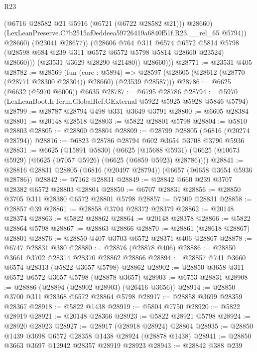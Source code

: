 \begin{lexlean}{R23}
\begin{coremodule}
                        (@6716 @28582 @21 @5916 (@6721 (@6722 @28582 @21)))
                        @28660)
                      (LexLeanPreserve.C7b2515af0eddeea59726419a6840f51f.R23.__rel_65 @5794))
                    @28660)
                  (@23041 @28677))
                (@28606
                  @764
                  @311
                  @6574
                  @6572
                  @5814
                  @5798
                  (@28598 @684 @239 @311 @6572 @6572 @5798 @5814 @28660 @23524)
                  @28660)))
            (@23531 @3629 @28290 @21480))
          @28660)))
@28771 := @23531 @405
@28782 := @28569
    (fun (core : @5894) =>
    @28597 (@28605 (@28612 (@28770 (@28771 @28300 @28304)) @28660) (@23539 @28587)))
@28786 := @6625 (@6632 (@5970 @6006)) @6635
@28787 := @6795 @28786
@28794 := @5970 (LexLeanBoot.IrTerm.GlobalRef.GExternal @5922 @5925 @5928 @5846 @5794)
@28799 := @28787 @28794 @498 @331 @3649 @3791
@28800 := @6605 @28384
@28801 := @20148 @28518
@28803 := @5822 @28801 @5798
@28804 := @5810 @28803
@28805 := @28800 @28804
@28809 := @28799 @28805 (@6816 (@20274 @28794))
@28816 := @6823 @28786 @28794 @602 @3654 @3708 @3790 @5936
@28831 := @6625
    (@15891 @5830)
    (@6625 (@15688 @5931) (@6625 (@10673 @5929) (@6625 (@7057 @5926) (@6625 (@6859 @5923) @28786))))
@28841 := @28816 @28831 @28805 (@6816 (@20497 @28794)) (@6657 (@6658 @3654 @5936 @28786))
@28842 := @7162 @28831
@28849 := @28842 @660 @239 @3707 @28382 @6572 @28803 @28804
@28850 := @6707 @28831
@28856 := @28850 @3705 @311 @28380 @6572 @28801 @5798
@28857 := @7309 @28831
@28858 := @28857 @39
@28861 := @28858 @3704 @28372 @28379
@28862 := @20148 @28374
@28863 := @5822 @28862
@28864 := @20148 @28378
@28866 := @5822 @28864 @5798
@28867 := @28863 @28866
@28870 := @28861 (@28618 @28867) @28801
@28876 := @28850 @407 @3703 @6572 @28371 @406 @28867
@28878 := @6747 @28831 @380
@28880 := @28876 (@28878 @406)
@28886 := @28850 @3661 @3702 @28314 @28370 @28862 @28866
@28894 := @28857 @741 @3660 @6574 @28313 (@5822 @3657 @5798) @28862
@28902 := @28850 @3658 @311 @6572 @6572 @3657 @5798 (@28878 @3657)
@28903 := @6753 @28831
@28908 := @28886 (@28894 (@28902 @28903) (@26416 @3656))
@28914 := @28850 @3700 @311 @28368 @6572 @28864 @5798
@28917 := @28858 @3699 @28359 @28367
@28918 := @5822 @1438
@28919 := @5804 @7750
@28920 := @5822 @28919
@28921 := @20148 @28366
@28923 := @5822 @28921 @5798
@28924 := @28920 @28923
@28927 := @28917 (@28918 @28924) @28864
@28935 := @28850 @1439 @3698 @6572 @28358 @1438 @28924 (@28878 @1438)
@28941 := @28850 @3663 @3697 @12942 @28357 @28919 @28923
@28943 := @28842 @388 @239

\end{coremodule}
\end{lexlean}
